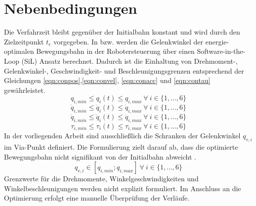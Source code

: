 \section{Nebenbedingungen}
Die Verfahrzeit bleibt gegenüber der Initialbahn konstant und wird durch den Zielzeitpunkt $t_e$ vorgegeben. 
In \cite[S.~40]{Eggers.2019} bzw. \cite[S.~5]{Hansen.2012} werden die Gelenkwinkel der energie-optimalen Bewegungsbahn in der Robotersteuerung über einen Software-in-the-Loop (SiL) Ansatz berechnet. Dadurch ist die Einhaltung von Drehmoment-, Gelenkwinkel-, Geschwindigkeit- und Beschleunigungsgrenzen entsprechend der Gleichungen \ref{eqn:conpos},\ref{eqn:convel}, \ref{eqn:conacc} und \ref{eqn:contau} gewährleistet. 
%
\begin{equation}
	\label{eqn:conpos}
	q_{i,min} \leq q_{i}(t) \leq q_{i,max}  ~\forall~ i \in \{1,...,6\}
\end{equation}
%
\begin{equation}
	\label{eqn:convel}
	\dot{q}_{i,min} \leq \dot{q}_{i}(t) \leq \dot{q}_{i,max}  ~\forall~ i \in \{1,...,6\}
\end{equation}
%
\begin{equation}
	\label{eqn:conacc}
	\ddot{q}_{i,min} \leq \ddot{q}_{i}(t) \leq \ddot{q}_{i,max}  ~\forall~ i \in \{1,...,6\}
\end{equation}
%
\begin{equation}
	\label{eqn:contau}
	\tau_{i,min} \leq \tau_{i}(t) \leq \tau_{i,max}  ~\forall~ i \in \{1,...,6\}
\end{equation}
%
In der vorliegenden Arbeit sind ausschließlich die Schranken der Gelenkwinkel $q_{v,i}$ im Via-Punkt definiert. Die Formulierung zielt darauf ab, dass die optimierte Bewegungsbahn nicht signifikant von der Initialbahn abweicht \cite[S.~5]{Hansen.2012}.
\begin{equation}
	\label{eqn:Schranken}
	q_{v,i} \in [q_{i,min};q_{i,max}] ~\forall~ i \in \{1,...,6\}
\end{equation}
Grenzwerte für die Drehmomente, Winkelgeschwindigkeiten und Winkelbeschleunigungen werden nicht explizit formuliert.  Im Anschluss an die Optimierung erfolgt eine manuelle Überprüfung der Verläufe.
%
